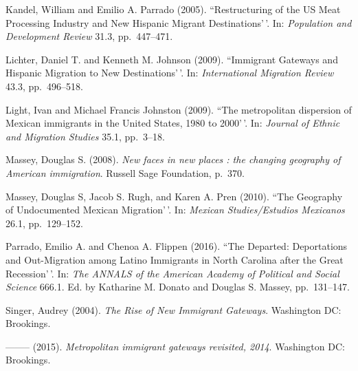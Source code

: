 \documentclass[11pt,]{article}
\begin{document}
Kandel, William and Emilio A. Parrado (2005). ``Restructuring of the US
Meat Processing Industry and New Hispanic Migrant Destinations'\,'. In:
\emph{Population and Development Review} 31.3, pp.~447--471.

Lichter, Daniel T. and Kenneth M. Johnson (2009). ``Immigrant Gateways
and Hispanic Migration to New Destinations'\,'. In:
\emph{International Migration Review} 43.3, pp.~496--518.

Light, Ivan and Michael Francis Johnston (2009). ``The metropolitan
dispersion of Mexican immigrants in the United States, 1980 to 2000'\,'.
In: \emph{Journal of Ethnic and Migration Studies} 35.1, pp.~3--18.

Massey, Douglas S. (2008).
\emph{New faces in new places : the changing geography of American immigration}.
Russell Sage Foundation, p.~370.

Massey, Douglas S, Jacob S. Rugh, and Karen A. Pren (2010). ``The
Geography of Undocumented Mexican Migration'\,'. In:
\emph{Mexican Studies/Estudios Mexicanos} 26.1, pp.~129--152.

Parrado, Emilio A. and Chenoa A. Flippen (2016). ``The Departed:
Deportations and Out-Migration among Latino Immigrants in North Carolina
after the Great Recession'\,'. In:
\emph{The ANNALS of the American Academy of Political and Social Science}
666.1. Ed. by Katharine M. Donato and Douglas S. Massey, pp.~131--147.

Singer, Audrey (2004). \emph{The Rise of New Immigrant Gateways}.
Washington DC: Brookings.

-------- (2015). \emph{Metropolitan immigrant gateways revisited, 2014}.
Washington DC: Brookings.
\end{document}

